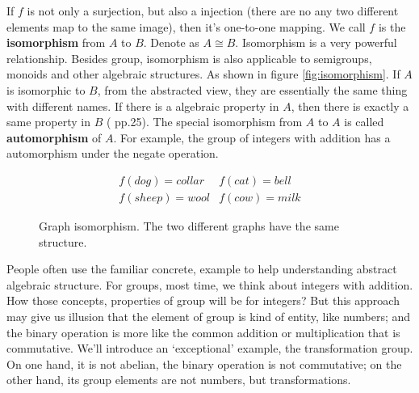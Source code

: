 \documentclass{article}
\begin{document}
If $f$ is not only a surjection, but also a injection (there are no any two different elements map to the same image), then it's one-to-one mapping. We call $f$ is the \textbf{isomorphism} from $A$ to $B$. Denote as $A \cong B$. Isomorphism is a very powerful relationship. Besides group, isomorphism is also applicable to semigroups, monoids and other algebraic structures. As shown in figure \ref{fig:isomorphism}. If $A$ is isomorphic to $B$, from the abstracted view, they are essentially the same thing with different names. If there is a algebraic property in $A$, then there is exactly a same property in $B$ (\cite{ZhangHeRui1978} pp.25). The special isomorphism from $A$ to $A$ is called \textbf{automorphism} of $A$. For example, the group of integers with addition has a automorphism under the negate operation.

\begin{figure}[htbp]
\centering
{}
\[
\begin{array}{rl}
f(dog) = collar & f(cat) = bell \\
f(sheep) = wool & f(cow) = milk
\end{array}
\]
\caption{Graph isomorphism. The two different graphs have the same structure.}
\label{fig:graph-isomorphism}
\end{figure}

People often use the familiar concrete, example to help understanding abstract algebraic structure. For groups, most time, we think about integers with addition. How those concepts, properties of group will be for integers? But this approach may give us illusion that the element of group is kind of entity, like numbers; and the binary operation is more like the common addition or multiplication that is commutative. We'll introduce an `exceptional' example, the transformation group. On one hand, it is not abelian, the binary operation is not commutative; on the other hand, its group elements are not numbers, but transformations.
\end{document}
